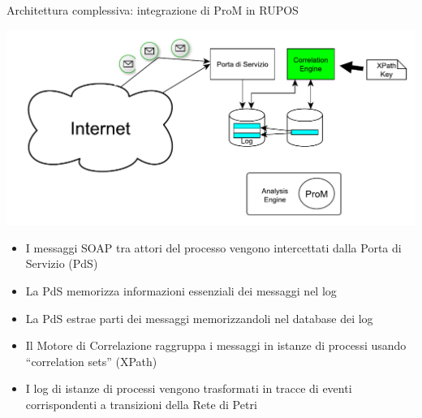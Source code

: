 \begin{frame}{Architettura complessiva: integrazione di ProM in RUPOS}
    

  
  \begin{center}
    \includegraphics[scale=0.30]{./fig/Platform04}
  \end{center}

  \begin{itemize}
  \item I messaggi SOAP tra attori del processo vengono intercettati dalla Porta di Servizio (PdS)
    \item La PdS memorizza informazioni essenziali dei messaggi nel log
     \item La PdS estrae parti dei messaggi memorizzandoli nel database dei log
     \item Il Motore di Correlazione raggruppa i messaggi in istanze di processi usando ``correlation sets'' (\alert{XPath})
    \item I log di istanze di processi vengono trasformati in tracce di eventi corrispondenti a transizioni della Rete di Petri

  \end{itemize}
\end{frame}

